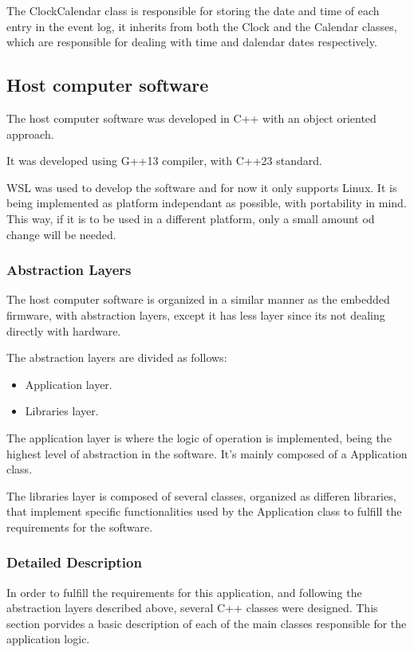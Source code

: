 \documentclass[10pt,twocolumn,letterpaper]{article}
\begin{document}
The ClockCalendar class is responsible for storing the date and time of each entry in the event log, it inherits from both the Clock and the Calendar classes, which are responsible for dealing with time and dalendar dates respectively.

\subsection{Host computer software}

The host computer software was developed in C++ with an object oriented approach.

It was developed using G++13 compiler, with C++23 standard.

WSL was used to develop the software and for now it only supports Linux.
It is being implemented as platform independant as possible, with portability in mind.
This way, if it is to be used in a different platform, only a small amount od change will be needed.

\subsubsection{Abstraction Layers}

The host computer software is organized in a similar manner as the embedded firmware, with abstraction layers, except it has less layer since its not dealing directly with hardware.

The abstraction layers are divided as follows:
\begin{itemize}
  \item Application layer.
  \item Libraries layer.
\end{itemize}

The application layer is where the logic of operation is implemented, being the highest level of abstraction in the software. It's mainly composed of a Application class.

The libraries layer is composed of several classes, organized as differen libraries, that implement specific functionalities used by the Application class to fulfill the requirements for the software.

\subsubsection{Detailed Description}

In order to fulfill the requirements for this application, and following the abstraction layers described above, several C++ classes were designed.
This section porvides a basic description of each of the main classes responsible for the application logic.
\end{document}
